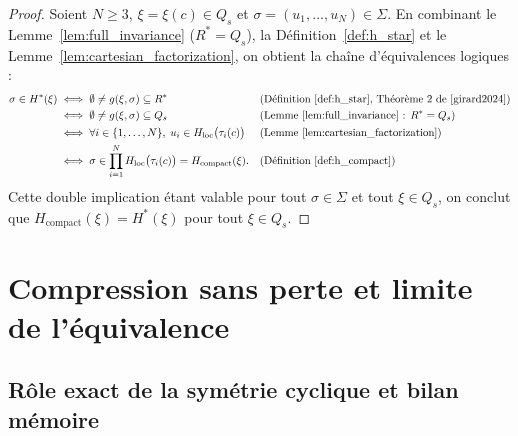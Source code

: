 \documentclass[11pt,a4paper]{article}
\theoremstyle{definition}
\theoremstyle{plain}
\begin{document}
\begin{proof}
Soient $N \ge 3$, $\xi = \xi(c) \in Q_s$ et $\sigma = (u_1, \dots, u_N) \in \Sigma$. En combinant le Lemme~\ref{lem:full_invariance} ($R^* = Q_s$), la Définition~\ref{def:h_star} et le Lemme~\ref{lem:cartesian_factorization}, on obtient la chaîne d'équivalences logiques :
\begin{align*}
  \sigma \in H^*(\xi)
  &\iff \emptyset \neq g(\xi, \sigma) \subseteq R^* && \text{(Définition~\ref{def:h_star}, Théorème~2 de~\cite{girard2024})} \\
  &\iff \emptyset \neq g(\xi, \sigma) \subseteq Q_s && \text{(Lemme~\ref{lem:full_invariance} : $R^* = Q_s$)} \\
  &\iff \forall i \in \{1, \dots, N\},\; u_i \in H_{\mathrm{loc}}\bigl(\tau_i(c)\bigr) && \text{(Lemme~\ref{lem:cartesian_factorization})} \\
  &\iff \sigma \in \prod_{i=1}^{N} H_{\mathrm{loc}}\bigl(\tau_i(c)\bigr) = H_{\mathrm{compact}}(\xi). && \text{(Définition~\ref{def:h_compact})}
\end{align*}
Cette double implication étant valable pour tout $\sigma \in \Sigma$ et tout $\xi \in Q_s$, on conclut que $H_{\mathrm{compact}}(\xi) = H^*(\xi)$ pour tout $\xi \in Q_s$.
\end{proof}

\section{Compression sans perte et limite de l'équivalence}

\subsection{Rôle exact de la symétrie cyclique et bilan mémoire}
\end{document}
